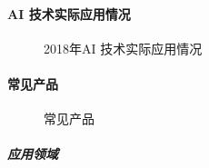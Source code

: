 \documentclass[letterpaper,10pt,english]{sphinxmanual}
\begin{document}
\paragraph{AI 技术实际应用情况}
\label{\detokenize{chapter_introduction/AI_Product:id4}}
\begin{figure}[H]
\centering
\capstart

\noindent{}
\caption{2018年AI
技术实际应用情况\sphinxfootnotemark[243]}\label{\detokenize{chapter_introduction/AI_Product:id17}}\end{figure}
%
\begin{footnotetext}[243]\sphinxAtStartFootnote
{}
%
\end{footnotetext}\ignorespaces 

\paragraph{常见产品}
\label{\detokenize{chapter_introduction/AI_Product:id5}}
\begin{figure}[H]
\centering
\capstart

\noindent{}
\caption{常见产品\sphinxfootnotemark[244]}\label{\detokenize{chapter_introduction/AI_Product:id18}}\end{figure}
%
\begin{footnotetext}[244]\sphinxAtStartFootnote
{}
%
\end{footnotetext}\ignorespaces 

\subparagraph{应用领域}
\label{\detokenize{chapter_introduction/AI_Product:id6}}
\end{document}
